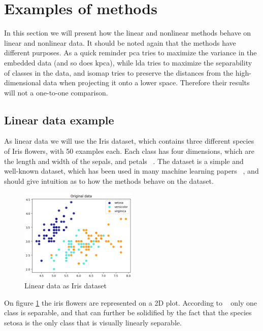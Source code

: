 \section{Examples of methods}\label{sec:examples-methods}
In this section we will present how the linear and nonlinear methods behave on linear and nonlinear data. It should be noted again that the methods have different purposes. As a quick reminder \gls{pca} tries to maximize the variance in the embedded data (and so does \gls{kpca}), while \gls{lda} tries to maximize the separability of classes in the data, and \gls{isomap} tries to preserve the distances from the high-dimensional data when projecting it onto a lower space. Therefore their results will not a one-to-one comparison.


\subsection{Linear data example}\label{subsec:linear-data-example}
As linear data we will use the Iris dataset, which contains three different species of Iris flowers, with 50 examples each. Each class has four dimensions, which are the length and width of the sepals, and petals ~\cite{iris-dataset}. The dataset is a simple and well-known dataset, which has been used in many machine learning papers ~\cite{iris-dataset}, and should give intuition as to how the methods behave on the dataset.

\begin{figure}[h]
\centering
\includegraphics[width=0.5\textwidth]{figures/theory-example-figures/linear-data.png}
\caption{Linear data as Iris dataset}
\label{fig:linear-data}
\end{figure}

On figure \ref{fig:linear-data} the iris flowers are represented on a 2D plot. According to ~\cite{iris-dataset} only one class is separable, and that can further be  solidified by the fact that the species setosa is the only class that is visually linearly separable.

